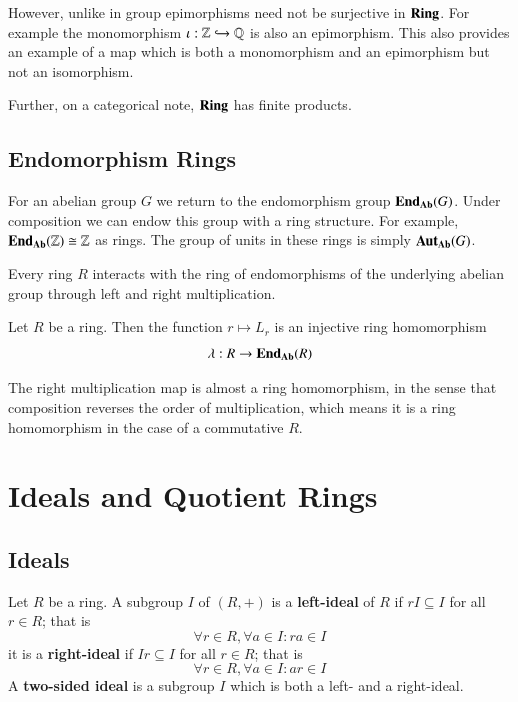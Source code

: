\documentclass[12pt, a4paper, oneside, openright, titlepage]{book}
\begin{document}
However, unlike in group epimorphisms need not be surjective in $\normalfont\textbf{Ring}$. For example the monomorphism $\iota:\mathbb Z\hookrightarrow \mathbb Q$ is also an epimorphism. This also provides an example of a map which is both a monomorphism and an epimorphism but not an isomorphism.


Further, on a categorical note, $\normalfont\textbf{Ring}$ has finite products.

\section{Endomorphism Rings}

For an abelian group $G$ we return to the endomorphism group $\mathbf{End}_{\normalfont\textbf{Ab}}(G)$. Under composition we can endow this group with a ring structure. For example, $\mathbf{End}_{\normalfont\textbf{Ab}}(\mathbb Z)\cong \mathbb Z$ as rings. The group of units in these rings is simply $\mathbf{Aut}_{\normalfont\textbf{Ab}}(G)$.

Every ring $R$ interacts with the ring of endomorphisms of the underlying abelian group through left and right multiplication.

\begin{prop}
    Let $R$ be a ring. Then the function $r\mapsto L_r$ is an injective ring homomorphism $$\lambda:R\rightarrow \mathbf{End}_{\normalfont\textbf{Ab}}(R)$$
\end{prop}

The right multiplication map is almost a ring homomorphism, in the sense that composition reverses the order of multiplication, which means it is a ring homomorphism in the case of a commutative $R$.




\chapter{Ideals and Quotient Rings}

\section{Ideals}

\begin{defn}
    Let $R$ be a ring. A subgroup $I$ of $(R,+)$ is a \textbf{left-ideal} of $R$ if $rI \subseteq I$ for all $r \in R$; that is $$\forall r\in R,\forall a \in I:ra \in I$$ it is a \textbf{right-ideal} if $Ir \subseteq I$ for all $r \in R$; that is $$\forall r \in R,\forall a \in I:ar \in I$$
    A \textbf{two-sided ideal} is a subgroup $I$ which is both a left- and a right-ideal.
\end{defn}
\end{document}
